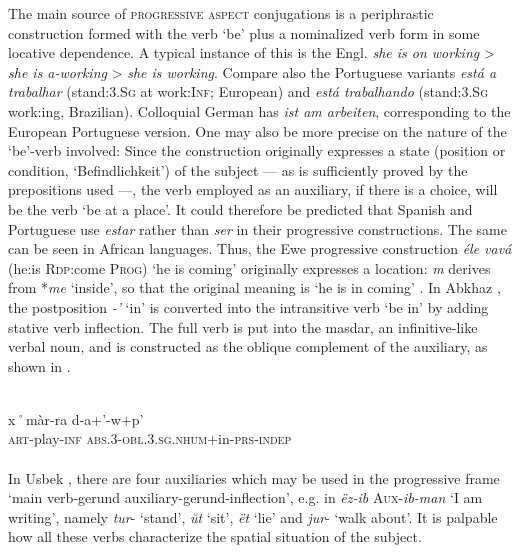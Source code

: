 \label{page33}The main source of \textsc{progressive aspect} conjugations is a periphrastic construction formed with the verb ‘be’ plus  a nominalized verb form in some locative dependence. A typical instance of this is the Engl. \textit{she is on working} {\textgreater} \textit{she is a-working} {\textgreater} \textit{she is working}. Compare also the Portuguese variants \textit{está a trabalhar} (stand:3.\textsc{Sg} at work:\textsc{Inf}; European) and \textit{está trabalhando} (stand:3.\textsc{Sg} work:ing, Brazilian). Colloquial German has \textit{ist am arbeiten}, corresponding to the European Portuguese version. One may also be more precise on the nature of the ‘be’-verb involved: Since the construction originally expresses a state (position or condition, ‘Befindlichkeit’) of the subject — as is sufficiently proved by the prepositions used —, the verb employed as an auxiliary, if there is a choice, will be the verb ‘be at a place’. It could therefore be predicted that Spanish and Portuguese use \textit{estar} rather than \textit{ser} in their progressive constructions. The same can be seen in African languages. Thus, the Ewe progressive construction \textit{éle vavá }(he:is \textsc{Rdp}:come \textsc{Prog}) ‘he is coming’ originally expresses a location: \textit{m} derives from *\textit{me} ‘inside’, so that the original meaning is ‘he is in coming’ \citep[105f]{Heine1980}. In Abkhaz \citep[128, 181f]{Hewitt1979}, the postposition \textit{{}-'} ‘in’ is converted into the intransitive verb ‘be in’ by adding stative verb inflection. The full verb is put into the masdar, an infinitive-like verbal noun, and is constructed as the oblique complement of the auxiliary, as shown in .

\ea\label{ex:E3} 
\\
 \gll {}x˚màr-ra  d-a+'-w+p'\\
\textsc{art}-play-\textsc{inf}  \textsc{abs}.3-\textsc{obl}.3.\textsc{sg}.\textsc{nhum}+in-\textsc{prs}-\textsc{indep}\\
\\
\z
\noindent In Usbek \citep[86]{Žirmunskij1966}, there are four auxiliaries which may be used in the progressive frame ‘main verb-gerund auxiliary-gerund-inflection’, e.g. in \textit{ëz-ib} \textsc{Aux}{}-\textit{ib-man} ‘I am writing’, namely \textit{tur}{}- ‘stand’, \textit{\u{u}t} ‘sit’, \textit{ët }‘lie’ and \textit{jur}{}- ‘walk about’. It is palpable how all these verbs characterize the spatial situation of the subject.

